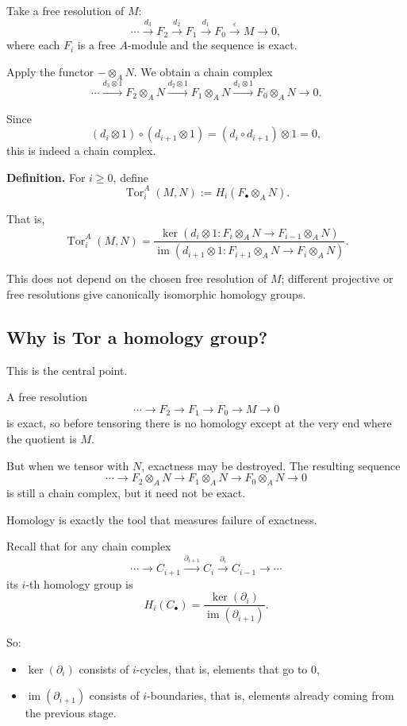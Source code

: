 \documentclass[12pt,a4paper]{article}
\theoremstyle{notespace}
\begin{document}
Take a free resolution of \(M\):
\[
\cdots \xrightarrow{d_3} F_2 \xrightarrow{d_2} F_1 \xrightarrow{d_1} F_0 \xrightarrow{\varepsilon} M \to 0,
\]
where each \(F_i\) is a free \(A\)-module and the sequence is exact.

Apply the functor \(-\otimes_A N\). We obtain a chain complex
\[
\cdots \xrightarrow{d_3\otimes 1} F_2\otimes_A N
\xrightarrow{d_2\otimes 1} F_1\otimes_A N
\xrightarrow{d_1\otimes 1} F_0\otimes_A N
\to 0.
\]

Since
\[
(d_i\otimes 1)\circ (d_{i+1}\otimes 1)
=
(d_i\circ d_{i+1})\otimes 1
=
0,
\]
this is indeed a chain complex.

\medskip

\textbf{Definition.}
For \(i\geq 0\), define
\[
\operatorname{Tor}_i^A(M,N):=
H_i(F_\bullet\otimes_A N).
\]

That is,
\[
\operatorname{Tor}_i^A(M,N)
=
\frac{
	\ker(d_i\otimes 1: F_i\otimes_A N \to F_{i-1}\otimes_A N)
}{
	\operatorname{im}(d_{i+1}\otimes 1: F_{i+1}\otimes_A N \to F_i\otimes_A N)
}.
\]

This does not depend on the chosen free resolution of \(M\); different projective or free resolutions give canonically isomorphic homology groups.

\subsection{Why is Tor a homology group?}

This is the central point.

A free resolution
\[
\cdots \to F_2\to F_1\to F_0\to M\to 0
\]
is exact, so before tensoring there is no homology except at the very end where the quotient is \(M\).

But when we tensor with \(N\), exactness may be destroyed. The resulting sequence
\[
\cdots \to F_2\otimes_A N \to F_1\otimes_A N \to F_0\otimes_A N \to 0
\]
is still a chain complex, but it need not be exact.

Homology is exactly the tool that measures failure of exactness.

Recall that for any chain complex
\[
\cdots \to C_{i+1}\xrightarrow{\partial_{i+1}} C_i \xrightarrow{\partial_i} C_{i-1}\to \cdots
\]
its \(i\)-th homology group is
\[
H_i(C_\bullet)
=
\frac{\ker(\partial_i)}{\operatorname{im}(\partial_{i+1})}.
\]

So:

\begin{itemize}
	\item \(\ker(\partial_i)\) consists of \(i\)-cycles, that is, elements that go to \(0\),
	\item \(\operatorname{im}(\partial_{i+1})\) consists of \(i\)-boundaries, that is, elements already coming from the previous stage.
\end{itemize}
\end{document}
